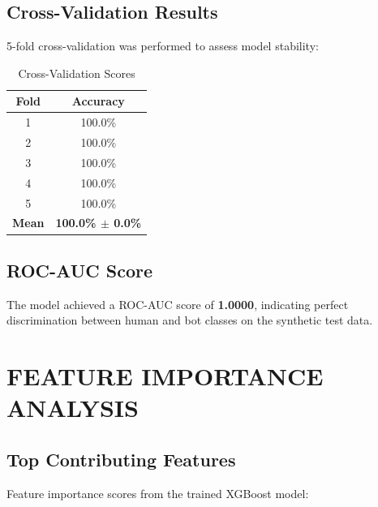 \subsection{Cross-Validation Results}

5-fold cross-validation was performed to assess model stability:

\begin{table}[H]
\centering
\caption{Cross-Validation Scores}
\label{tab:cv_scores}
\begin{tabular}{|c|c|}
\hline
\textbf{Fold} & \textbf{Accuracy} \\
\hline
1 & 100.0\% \\
\hline
2 & 100.0\% \\
\hline
3 & 100.0\% \\
\hline
4 & 100.0\% \\
\hline
5 & 100.0\% \\
\hline
\textbf{Mean} & \textbf{100.0\% $\pm$ 0.0\%} \\
\hline
\end{tabular}
\end{table}

\subsection{ROC-AUC Score}

The model achieved a ROC-AUC score of \textbf{1.0000}, indicating perfect discrimination between human and bot classes on the synthetic test data.

\section{FEATURE IMPORTANCE ANALYSIS}

\subsection{Top Contributing Features}

Feature importance scores from the trained XGBoost model:

